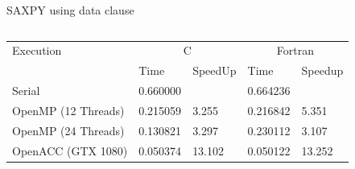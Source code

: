 \documentclass[10pt,t]{beamer}
\begin{document}
\begin{frame}{ SAXPY using data clause}
%      
%      
  \begin{columns}
    \begin{exampleblock}{}
      \begin{tabular}{|b|b|b|b|b|}
        \hline
        \rowcolor{lublue}Execution& \multicolumn{2}{c|}{C}& \multicolumn{2}{c|}{Fortran} \\
        \cline{2-5}
        \rowcolor{lublue}&  Time & SpeedUp & Time & Speedup \\
        \hline
        Serial & 0.660000 & & 0.664236 & \\
        OpenMP (12 Threads) & 0.215059 & 3.255 & 0.216842 & 5.351 \\
        OpenMP (24 Threads) & 0.130821 & 3.297 & 0.230112 & 3.107 \\
        OpenACC (GTX 1080) & 0.050374 & 13.102 & 0.050122 & 13.252 \\
          \hline
      \end{tabular}
    \end{exampleblock}
  \end{columns}
\end{frame}
\end{document}
